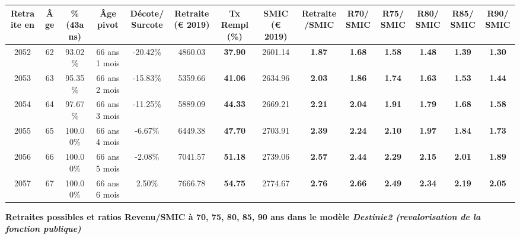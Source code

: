 \begin{adjustbox}{max width=\textwidth} 
\begin{tabular}[htb]{|c|c||c|c|c||c|c||c|c||c|c|c|c|c|} 
\hline 
 Retraite en &  Âge &  \%(43ans) &  Âge pivot &  Décote/Surcote &  Retraite (\euro{} 2019) &  Tx Rempl(\%) &  SMIC (\euro{} 2019) &  Retraite/SMIC &  R70/SMIC &  R75/SMIC &  R80/SMIC &  R85/SMIC &  R90/SMIC \\ 
\hline \hline 
 2052 &  62 &  93.02\% &  66 ans 1 mois &  -20.42\% &  4860.03 &  {\bf 37.90} &  2601.14 &  {\bf 1.87} &  {\bf 1.68} &  {\bf 1.58} &  {\bf 1.48} &  {\bf 1.39} &  {\bf 1.30} \\ 
\hline 
 2053 &  63 &  95.35\% &  66 ans 2 mois &  -15.83\% &  5359.66 &  {\bf 41.06} &  2634.96 &  {\bf 2.03} &  {\bf 1.86} &  {\bf 1.74} &  {\bf 1.63} &  {\bf 1.53} &  {\bf 1.44} \\ 
\hline 
 2054 &  64 &  97.67\% &  66 ans 3 mois &  -11.25\% &  5889.09 &  {\bf 44.33} &  2669.21 &  {\bf 2.21} &  {\bf 2.04} &  {\bf 1.91} &  {\bf 1.79} &  {\bf 1.68} &  {\bf 1.58} \\ 
\hline 
 2055 &  65 &  100.00\% &  66 ans 4 mois &  -6.67\% &  6449.38 &  {\bf 47.70} &  2703.91 &  {\bf 2.39} &  {\bf 2.24} &  {\bf 2.10} &  {\bf 1.97} &  {\bf 1.84} &  {\bf 1.73} \\ 
\hline 
 2056 &  66 &  100.00\% &  66 ans 5 mois &  -2.08\% &  7041.57 &  {\bf 51.18} &  2739.06 &  {\bf 2.57} &  {\bf 2.44} &  {\bf 2.29} &  {\bf 2.15} &  {\bf 2.01} &  {\bf 1.89} \\ 
\hline 
 2057 &  67 &  100.00\% &  66 ans 6 mois &  2.50\% &  7666.78 &  {\bf 54.75} &  2774.67 &  {\bf 2.76} &  {\bf 2.66} &  {\bf 2.49} &  {\bf 2.34} &  {\bf 2.19} &  {\bf 2.05} \\ 
\hline 
\hline 
\end{tabular} 
\end{adjustbox} 
 
 \vspace{0.1cm} 
{\bf \noindent Retraites possibles et ratios Revenu/SMIC à 70, 75, 80, 85, 90 ans dans le modèle \emph{Destinie2 (revalorisation de la fonction publique)}}  
 
